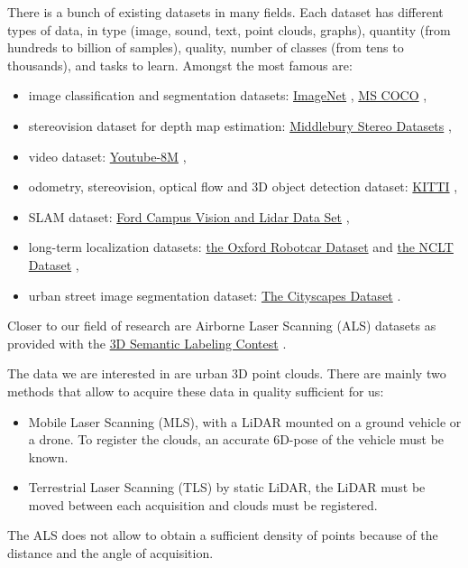 \documentclass[a4paper, 10pt, journal]{article}
\begin{document}
There is a bunch of existing datasets in many fields. Each dataset has different types of data, in type (image, sound, text, point clouds, graphs), quantity (from hundreds to billion of samples), quality, number of classes (from tens to thousands), and tasks to learn. Amongst the most famous are:
\begin{itemize}
 \item image classification and segmentation datasets:  \href{http://www.image-net.org/}{ImageNet} \cite{deng2009imagenet}, \href{http://mscoco.org/}{MS COCO} \cite{lin2014microsoft},
 \item stereovision dataset for depth map estimation: \href{http://vision.middlebury.edu/stereo/data/}{Middlebury Stereo Datasets} \cite{scharstein2014high},
 \item video dataset: \href{https://research.google.com/youtube8m/}{Youtube-8M} \cite{abu2016youtube},
 \item odometry, stereovision, optical flow and 3D object detection dataset: \href{http://www.cvlibs.net/datasets/kitti/index.php}{KITTI} \cite{Geiger2012CVPR},
 \item SLAM dataset: \href{http://robots.engin.umich.edu/SoftwareData/Ford}{Ford Campus Vision and Lidar Data Set} \cite{pandey2011ford},
 \item long-term localization datasets: \href{http://robotcar-dataset.robots.ox.ac.uk/}{the Oxford Robotcar Dataset} \cite{RobotCarDatasetIJRR} and \href{http://robots.engin.umich.edu/nclt/}{the NCLT Dataset} \cite{carlevaris2016university},
 \item urban street image segmentation dataset: \href{https://www.cityscapes-dataset.com/}{The Cityscapes Dataset} \cite{cordts2016cityscapes}.
\end{itemize} 
Closer to our field of research are Airborne Laser Scanning (ALS) datasets as provided with the \href{http://www2.isprs.org/commissions/comm3/wg4/3d-semantic-labeling.html}{3D Semantic Labeling Contest} \cite{niemeyer2014contextual}.

The data we are interested in are urban 3D point clouds. There are mainly two methods that allow to acquire these data in quality sufficient for us:
\begin{itemize}
 \item Mobile Laser Scanning (MLS), with a LiDAR mounted on a ground vehicle or a drone. To register the clouds, an accurate 6D-pose of the vehicle must be known.
 \item  Terrestrial Laser Scanning (TLS) by static LiDAR, the LiDAR must be moved between each acquisition and clouds must be registered.
\end{itemize}
The ALS does not allow to obtain a sufficient density of points because of the distance and the angle of acquisition.
\end{document}
